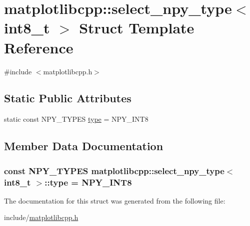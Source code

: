 \hypertarget{structmatplotlibcpp_1_1select__npy__type_3_01int8__t_01_4}{}\section{matplotlibcpp\+:\+:select\+\_\+npy\+\_\+type$<$ int8\+\_\+t $>$ Struct Template Reference}
\label{structmatplotlibcpp_1_1select__npy__type_3_01int8__t_01_4}


{\ttfamily \#include $<$matplotlibcpp.\+h$>$}

\subsection*{Static Public Attributes}
\begin{DoxyCompactItemize}
\item 
static const N\+P\+Y\+\_\+\+T\+Y\+P\+ES \hyperlink{structmatplotlibcpp_1_1select__npy__type_3_01int8__t_01_4_a74836a19458ed32ca8948a4337364eae}{type} = N\+P\+Y\+\_\+\+I\+N\+T8
\end{DoxyCompactItemize}


\subsection{Member Data Documentation}
\subsubsection[{\texorpdfstring{type}{type}}]{\setlength{\rightskip}{0pt plus 5cm}const N\+P\+Y\+\_\+\+T\+Y\+P\+ES {\bf matplotlibcpp\+::select\+\_\+npy\+\_\+type}$<$ int8\+\_\+t $>$\+::type = N\+P\+Y\+\_\+\+I\+N\+T8\hspace{0.3cm}{\ttfamily [static]}}\hypertarget{structmatplotlibcpp_1_1select__npy__type_3_01int8__t_01_4_a74836a19458ed32ca8948a4337364eae}{}\label{structmatplotlibcpp_1_1select__npy__type_3_01int8__t_01_4_a74836a19458ed32ca8948a4337364eae}


The documentation for this struct was generated from the following file\+:\begin{DoxyCompactItemize}
\item 
include/\hyperlink{matplotlibcpp_8h}{matplotlibcpp.\+h}\end{DoxyCompactItemize}
